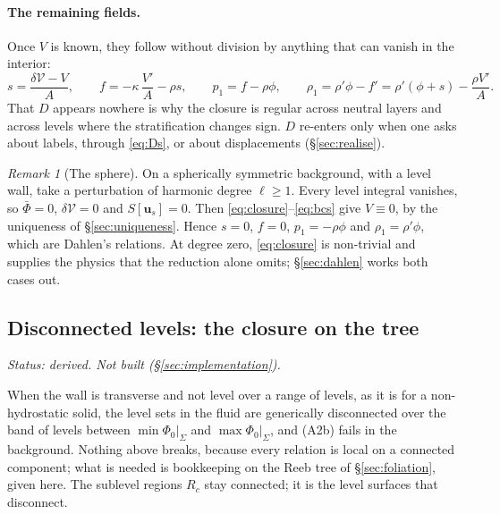 \documentclass[11pt]{article}
\theoremstyle{definition}
\theoremstyle{remark}
\newtheorem{remark}{Remark}
\newcommand{\bu}{\mathbf{u}}
\newcommand{\Vol}{\mathcal V}
\newcommand{\status}[1]{\noindent\emph{Status: #1}\par\smallskip}
\begin{document}
\paragraph{The remaining fields.} Once $V$ is known, they follow
without division by anything that can vanish in the interior:
\begin{equation}
  s = \frac{\delta\Vol - V}{A},\qquad
  f = -\kappa\,\frac{V'}{A} - \rho s,\qquad
  p_1 = f - \rho\phi,\qquad
  \rho_1 = \rho'\phi - f' = \rho'(\phi + s) - \frac{\rho V'}{A} .
  \label{eq:V-dict}
\end{equation}
That $D$ appears nowhere is why the closure is regular across neutral
layers and across levels where the stratification changes sign. $D$
re-enters only when one asks about labels, through \eqref{eq:Ds}, or
about displacements (\S\ref{sec:realise}).

\begin{remark}[The sphere]
\label{rem:sphere}
On a spherically symmetric background, with a level wall, take a
perturbation of harmonic degree $\ell \ge 1$. Every level integral
vanishes, so $\bar\Phi = 0$, $\delta\Vol = 0$ and $S[\bu_s] = 0$. Then
\eqref{eq:closure}--\eqref{eq:bcs} give $V \equiv 0$, by the
uniqueness of \S\ref{sec:uniqueness}. Hence $s = 0$, $f = 0$, $p_1 =
-\rho\phi$ and $\rho_1 = \rho'\phi$, which are Dahlen's relations. At
degree zero, \eqref{eq:closure} is non-trivial and supplies the physics
that the reduction alone omits; \S\ref{sec:dahlen} works both cases
out.
\end{remark}

\subsection{Disconnected levels: the closure on the tree}
\label{sec:tree}

\status{derived. Not built (\S\ref{sec:implementation}).}

When the wall is transverse and not level over a range of levels, as
it is for a non-hydrostatic solid, the level sets in the fluid are
generically disconnected over the band of levels between
$\min\Phi_0|_\Sigma$ and $\max\Phi_0|_\Sigma$, and (A2b) fails in the
background. Nothing above breaks, because every relation is local on a
connected component; what is needed is bookkeeping on the Reeb tree of
\S\ref{sec:foliation}, given here. The sublevel regions $R_c$ stay
connected; it is the level surfaces that disconnect.
\end{document}
